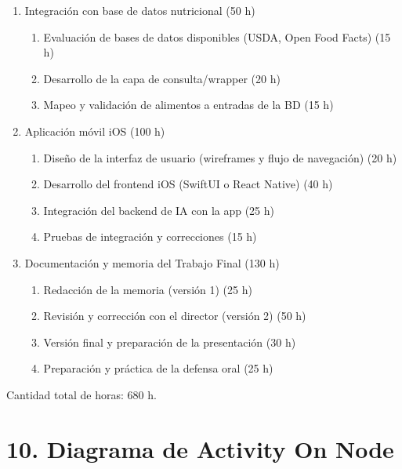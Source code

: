 \documentclass[
11pt, %
]{charter}
\begin{document}
\begin{enumerate}
	\begin{enumerate}
	\item Investigación de técnicas de estimación de volumen monocular (20 h)
	\item Implementación del módulo de estimación (40 h)
	\item Evaluación del módulo (error relativo sobre set de prueba) (20 h)
	\item Integración con el módulo de reconocimiento (20 h)
	\end{enumerate}
\item Integración con base de datos nutricional (50 h)
	\begin{enumerate}
	\item Evaluación de bases de datos disponibles (USDA, Open Food Facts) (15 h)
	\item Desarrollo de la capa de consulta/wrapper (20 h)
	\item Mapeo y validación de alimentos a entradas de la BD (15 h)
	\end{enumerate}
\item Aplicación móvil iOS (100 h)
	\begin{enumerate}
	\item Diseño de la interfaz de usuario (wireframes y flujo de navegación) (20 h)
	\item Desarrollo del frontend iOS (SwiftUI o React Native) (40 h)
	\item Integración del backend de IA con la app (25 h)
	\item Pruebas de integración y correcciones (15 h)
	\end{enumerate}
\item Documentación y memoria del Trabajo Final (130 h)
	\begin{enumerate}
	\item Redacción de la memoria (versión 1) (25 h)
	\item Revisión y corrección con el director (versión 2) (50 h)
	\item Versión final y preparación de la presentación (30 h)
	\item Preparación y práctica de la defensa oral (25 h)
	\end{enumerate}
\end{enumerate}

Cantidad total de horas: 680 h.

\section{10. Diagrama de Activity On Node}
\label{sec:AoN}
\end{document}
